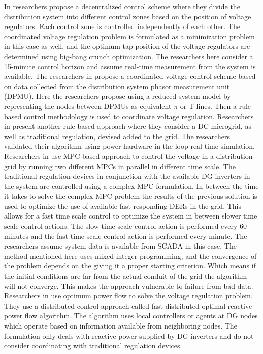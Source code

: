 In \cite{NLR_2} researchers propose a decentralized control scheme where they divide the distribution system into different control zones based on the position of voltage regulators. Each control zone is controlled independently of each other. The coordinated voltage regulation problem is formulated as a minimization problem in this case as well, and the optimum tap position of the voltage regulators are determined using big-bang crunch optimization. The researchers here consider a 15-minute control horizon and assume real-time measurement from the system is available.
The researchers in \cite{NLR_3} propose a coordinated voltage control scheme based on data collected from the distribution system phasor measurement unit (DPMU). Here the researchers propose using a reduced system model by representing the nodes between DPMUs as equivalent $\pi$ or T  lines. Then a rule-based control methodology is used to coordinate voltage regulation.  
Researchers in \cite{NLR_4} present another rule-based approach where they consider a DC microgrid, as well as traditional regulation, devised added to the grid. The researchers validated their algorithm using power hardware in the loop real-time simulation. 
Researchers in \cite{NLR_5} use MPC based approach to control the voltage in a distribution grid by running two different MPCs in parallel in different time scale. The traditional regulation devices in conjunction with the available DG inverters in the system are controlled using a complex MPC formulation. In between the time it takes to solve the complex MPC problem the results of the previous solution is used to optimize the use of available fast responding DERs in the grid. This allows for a fast time scale control to optimize the system in between slower time scale control actions. The slow time scale control action is performed every 60 minutes and the fast time scale control action is performed every minute. The researchers assume system data is available from SCADA in this case. The method mentioned here uses mixed integer programming, and the convergence of the problem depends on the giving it a proper starting criterion. Which means if the initial conditions are far from the actual conduit of the grid the algorithm will not converge. This makes the approach vulnerable to failure from bad data.
Researchers in \cite{NLR_6} use optimum power flow to solve the voltage regulation problem. They use a distributed control approach called fast distributed optimal reactive power flow algorithm. The algorithm uses local controllers or agents at DG nodes which operate based on information available from neighboring nodes. The formulation only deals with reactive power supplied by DG inverters and do not consider coordinating with traditional regulation devices. 
